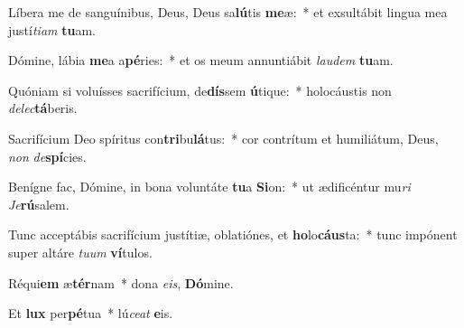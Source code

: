 \item Líbera me de sanguínibus, Deus, Deus sa\textbf{lú}tis \textbf{me}æ:~* et exsultábit lingua mea justí\textit{ti}\textit{am} \textbf{tu}am.

\item Dómine, lábia \textbf{me}a a\textbf{pé}ries:~* et os meum annuntiábit \textit{lau}\textit{dem} \textbf{tu}am.

\item Quóniam si voluísses sacrifícium, de\textbf{dís}sem \textbf{ú}tique:~* holocáustis non \textit{de}\textit{lec}\textbf{tá}beris.

\item Sacrifícium Deo spíritus con\textbf{tri}bu\textbf{lá}tus:~* cor contrítum et humiliátum, Deus, \textit{non} \textit{de}\textbf{spí}cies.

\item Benígne fac, Dómine, in bona voluntáte \textbf{tu}a \textbf{Si}on:~* ut ædificéntur mu\textit{ri} \textit{Je}\textbf{rú}salem.

\item Tunc acceptábis sacrifícium justítiæ, oblatiónes, et \textbf{ho}lo\textbf{cáus}ta:~* tunc impónent super altáre \textit{tu}\textit{um} \textbf{ví}tulos.

\item Réqui\textbf{em} æ\textbf{tér}nam~* dona \textit{e}\textit{is}, \textbf{Dó}mine.

\item Et \textbf{lux} per\textbf{pé}tua~* lú\textit{ce}\textit{at} \textbf{e}is.